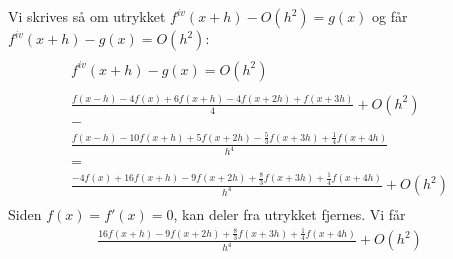 Vi skrives så om utrykket ${f^{iv}}(x + h) - O(h^2) = g(x)$ og får\nonumber \\ ${f^{iv}}(x + h) - g(x) = O(h^2)$:
\begin{multline}
\\{f^{iv}}(x + h) - g(x) = O(h^2) \\ \\
\frac{f(x-h)-4f(x)+6f(x+h)-4f(x+2h)+f(x+3h)}{4}+O(h^2) \\
- \\
\frac{f(x-h)-10f(x+h)+5f(x+2h)-\frac{5}{3}f(x+3h)+\frac{1}{4}f(x+4h)}{h^4} \\
= \\
\frac{-4f(x)+16f(x+h)-9f(x+2h)+\frac{8}{3}f(x+3h)+\frac{1}{4}f(x+4h)}{h^4}+O(h^2) \\
\end{multline}
Siden $f(x) = f'(x) = 0$, kan deler fra utrykket fjernes. Vi får
\begin{multline}
\frac{16f(x+h)-9f(x+2h)+\frac{8}{3}f(x+3h)+\frac{1}{4}f(x+4h)}{h^4}+O(h^2) \\
\end{multline}
